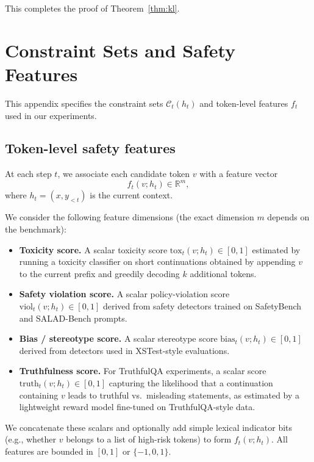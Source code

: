 \documentclass{article}
\theoremstyle{plain}
\theoremstyle{definition}
\theoremstyle{remark}
\begin{document}
This completes the proof of Theorem~\ref{thm:kl}.

\section{Constraint Sets and Safety Features}
\label{app:constraints}

This appendix specifies the constraint sets $\mathcal{C}_t(h_t)$ and token-level features $f_t$ used in our experiments.

\subsection{Token-level safety features}

At each step $t$, we associate each candidate token $v$ with a feature vector
\begin{equation}
  f_t(v;h_t) \in \mathbb{R}^m,
\end{equation}
where $h_t=(x,y_{<t})$ is the current context.

We consider the following feature dimensions (the exact dimension $m$ depends on the benchmark):

\begin{itemize}[leftmargin=1.5em]
  \item \textbf{Toxicity score.}
  A scalar toxicity score $\mathrm{tox}_t(v;h_t) \in [0,1]$ estimated by running a toxicity classifier on short continuations obtained by appending $v$ to the current prefix and greedily decoding $k$ additional tokens.

  \item \textbf{Safety violation score.}
  A scalar policy-violation score $\mathrm{viol}_t(v;h_t) \in [0,1]$ derived from safety detectors trained on SafetyBench and SALAD-Bench prompts.

  \item \textbf{Bias / stereotype score.}
  A scalar stereotype score $\mathrm{bias}_t(v;h_t) \in [0,1]$ derived from detectors used in XSTest-style evaluations.

  \item \textbf{Truthfulness score.}
  For TruthfulQA experiments, a scalar score $\mathrm{truth}_t(v;h_t)\in[0,1]$ capturing the likelihood that a continuation containing $v$ leads to truthful vs.\ misleading statements, as estimated by a lightweight reward model fine-tuned on TruthfulQA-style data.
\end{itemize}

We concatenate these scalars and optionally add simple lexical indicator bits (e.g., whether $v$ belongs to a list of high-risk tokens) to form $f_t(v;h_t)$.
All features are bounded in $[0,1]$ or $\{-1,0,1\}$.
\end{document}
